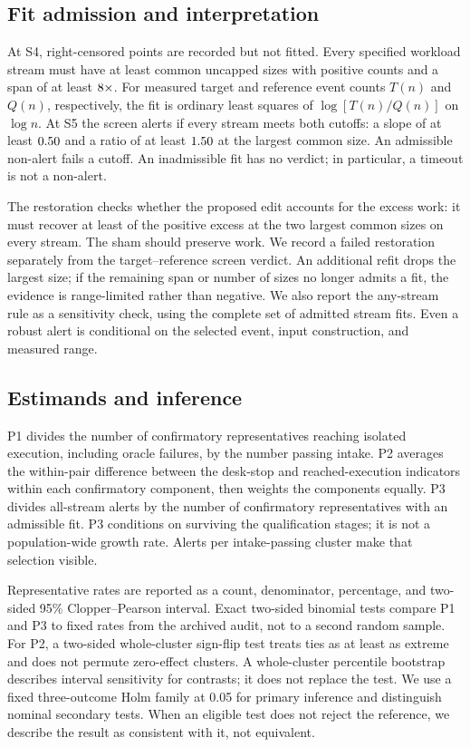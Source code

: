 \documentclass[11pt]{article}
\begin{document}
\subsection{Fit admission and interpretation}

At \textsc{S4}, right-censored points are recorded but not fitted. Every
specified workload stream must have at least \BenchMinSizes{} common
uncapped sizes with positive counts and a span of at least
\(8\times\). For measured target and reference event counts
\(T(n)\) and \(Q(n)\), respectively, the fit is ordinary least squares of
\(\log[T(n)/Q(n)]\) on \(\log n\). At \textsc{S5} the screen alerts if every
stream meets both cutoffs: a slope of at least \(0.50\) and a
ratio of at least \(1.50\) at the largest common size. An
admissible non-alert fails a cutoff. An inadmissible fit has no verdict;
in particular, a timeout is not a non-alert.

The restoration checks whether the proposed edit accounts for the excess
work: it must recover at least \BenchRecovery{} of the positive excess at
the two largest common sizes on every stream. The sham should preserve
work. We record a failed restoration separately from the target--reference
screen verdict. An additional refit drops the largest size; if the
remaining span or number of sizes no longer admits a fit, the evidence is
range-limited rather than negative. We also report the any-stream rule as
a sensitivity check, using the complete set of admitted stream fits.
Even a robust alert is conditional on the selected event, input
construction, and measured range.

\subsection{Estimands and inference}

P1 divides the number of confirmatory representatives reaching isolated
execution, including oracle failures, by the number passing intake.
P2 averages the within-pair difference between the desk-stop and
reached-execution indicators within each confirmatory component, then
weights the components equally. P3 divides all-stream alerts by the number
of confirmatory representatives with an admissible fit. P3 conditions on
surviving the qualification stages; it is not a population-wide growth
rate. Alerts per intake-passing cluster make that selection visible.

Representative rates are reported as a count, denominator, percentage, and
two-sided 95\% Clopper--Pearson interval. Exact two-sided binomial tests
compare P1 and P3 to fixed rates from the archived audit, not to a second
random sample. For P2, a two-sided whole-cluster sign-flip test treats ties
as at least as extreme and does not permute zero-effect clusters. A
whole-cluster percentile bootstrap describes interval sensitivity for
contrasts; it does not replace the test. We use a fixed three-outcome Holm family at
0.05 for primary inference and distinguish nominal secondary tests.
When an eligible test does not reject the reference, we describe the
result as consistent with it, not equivalent.
\end{document}
